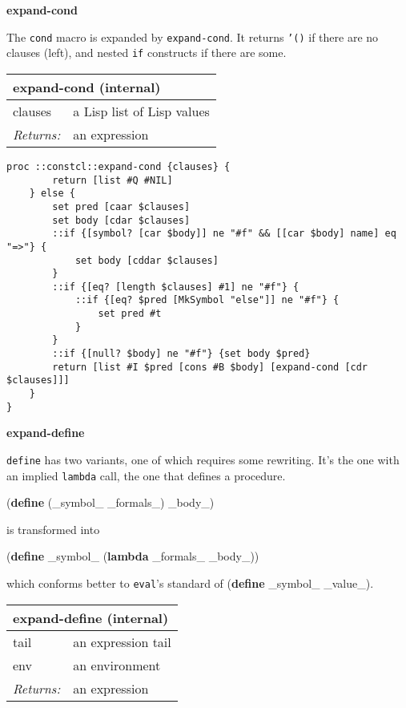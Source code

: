 \documentclass{report}
\begin{document}
\textbf{expand-cond}


The \texttt{cond} macro is expanded by \texttt{expand-cond}. It returns \texttt{'()} if there are no clauses (left), and nested \texttt{if} constructs if there are some.

\begin{tabular}{ |l l| }
\hline
\multicolumn{2}{|l|}{expand-cond (internal)} \\
\hline
clauses & a Lisp list of Lisp values \\
\textit{Returns:} & an expression \\
\hline
\end{tabular}

\noindent\makebox[\linewidth]{\rule{\linewidth}{0.4pt}}
\begin{lstlisting}
proc ::constcl::expand-cond {clauses} {
        return [list #Q #NIL]
    } else {
        set pred [caar $clauses]
        set body [cdar $clauses]
        ::if {[symbol? [car $body]] ne "#f" && [[car $body] name] eq "=>"} {
            set body [cddar $clauses]
        }
        ::if {[eq? [length $clauses] #1] ne "#f"} {
            ::if {[eq? $pred [MkSymbol "else"]] ne "#f"} {
                set pred #t
            }
        }
        ::if {[null? $body] ne "#f"} {set body $pred}
        return [list #I $pred [cons #B $body] [expand-cond [cdr $clauses]]]
    }
}
\end{lstlisting}
\noindent\makebox[\linewidth]{\rule{\linewidth}{0.4pt}}

\textbf{expand-define}


\texttt{define} has two variants, one of which requires some rewriting. It's the one with an implied \texttt{lambda} call, the one that defines a procedure.


(\textbf{define} (\_symbol\_ \_formals\_) \_body\_)


is transformed into


(\textbf{define} \_symbol\_ (\textbf{lambda} \_formals\_ \_body\_))


which conforms better to \texttt{eval}'s standard of (\textbf{define} \_symbol\_ \_value\_).

\begin{tabular}{ |l l| }
\hline
\multicolumn{2}{|l|}{expand-define (internal)} \\
\hline
tail & an expression tail \\
env & an environment \\
\textit{Returns:} & an expression \\
\hline
\end{tabular}
\end{document}
